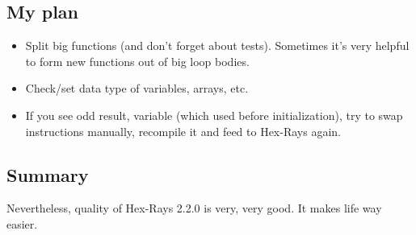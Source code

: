 \subsection{My plan}

\begin{itemize}
\item Split big functions (and don't forget about tests).
Sometimes it's very helpful to form new functions out of big loop bodies.

\item Check/set data type of variables, arrays, etc.

\item If you see odd result,  variable (which used before initialization), try to swap instructions manually,
recompile it and feed to Hex-Rays again.
\end{itemize}

\subsection{Summary}

Nevertheless, quality of Hex-Rays 2.2.0 is very, very good.
It makes life way easier.

